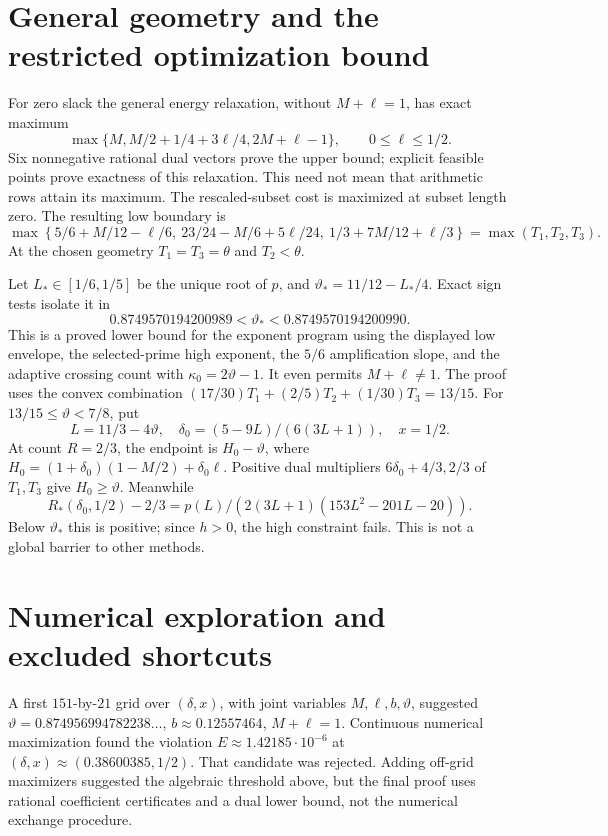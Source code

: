 \documentclass[12pt]{article}
\begin{document}
\section{General geometry and the restricted optimization bound}
For zero slack the general energy relaxation, without
\(M+\ell=1\), has exact maximum
\[
 \max\{M,M/2+1/4+3\ell/4,2M+\ell-1\},\qquad 0\le\ell\le1/2.
\]
Six nonnegative rational dual vectors prove the upper bound;
explicit feasible points prove exactness of this relaxation.
This need not mean that arithmetic rows attain its maximum.
The rescaled-subset cost is maximized at subset length zero.
The resulting low boundary is
\[
 \max\left\{
 5/6+M/12-\ell/6,\
 23/24-M/6+5\ell/24,\
 1/3+7M/12+\ell/3
 \right\}=\max(T_1,T_2,T_3).
\]
At the chosen geometry \(T_1=T_3=\theta\) and \(T_2<\theta\).

Let \(L_*\in[1/6,1/5]\) be the unique root of \(p\), and
\(\vartheta_*=11/12-L_*/4\).
Exact sign tests isolate it in
\[
 0.8749570194200989
       <\vartheta_*<0.8749570194200990 .
\]
This is a proved lower bound for the exponent program using the
displayed low envelope, the selected-prime high exponent, the
\(5/6\) amplification slope, and the adaptive crossing count
with \(\kappa_0=2\vartheta-1\).
It even permits \(M+\ell\ne1\).
The proof uses the convex combination
\((17/30)T_1+(2/5)T_2+(1/30)T_3=13/15\).
For \(13/15\le\vartheta<7/8\), put
\[
 L=11/3-4\vartheta,\quad
 \delta_0=(5-9L)/(6(3L+1)),\quad x=1/2.
\]
At count \(R=2/3\), the endpoint is
\(H_0-\vartheta\), where
\(H_0=(1+\delta_0)(1-M/2)+\delta_0\ell\).
Positive dual multipliers \(6\delta_0+4/3,2/3\) of \(T_1,T_3\)
give \(H_0\ge\vartheta\).  Meanwhile
\[
 R_*(\delta_0,1/2)-2/3=
 p(L)/(2(3L+1)(153L^2-201L-20)).
\]
Below \(\vartheta_*\) this is positive; since \(h>0\), the high
constraint fails.  This is not a global barrier to other methods.

\section{Numerical exploration and excluded shortcuts}
A first \(151\)-by-\(21\) grid over \((\delta,x)\), with joint
variables \(M,\ell,b,\vartheta\), suggested
\(\vartheta=0.874956994782238\ldots\),
\(b\approx0.12557464\), \(M+\ell=1\).
Continuous numerical maximization found the violation
\(E\approx1.42185\cdot10^{-6}\) at
\((\delta,x)\approx(0.38600385,1/2)\).
That candidate was rejected.  Adding off-grid maximizers suggested
the algebraic threshold above, but the final proof uses rational
coefficient certificates and a dual lower bound, not the numerical
exchange procedure.
\end{document}
